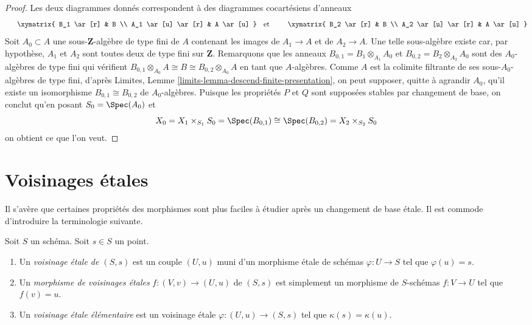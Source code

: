 \begin{proof}
Les deux diagrammes donnés correspondent à des diagrammes cocartésiens d'anneaux
$$
\vcenter{
\xymatrix{
B_1 \ar[r] & B \\
A_1 \ar[u] \ar[r] & A \ar[u]
}
}
\quad\text{et}\quad
\vcenter{
\xymatrix{
B_2 \ar[r] & B \\
A_2 \ar[u] \ar[r] & A \ar[u]
}
}
$$
Soit $A_0 \subset A$ une sous-$\mathbf{Z}$-algèbre de type fini de $A$
contenant les images de $A_1 \to A$ et de $A_2 \to A$. Une telle sous-algèbre
existe car, par hypothèse, $A_1$ et $A_2$ sont toutes deux de type fini sur
$\mathbf{Z}$. Remarquons que les anneaux $B_{0, 1} = B_1 \otimes_{A_1} A_0$
et $B_{0, 2} = B_2 \otimes_{A_2} A_0$ sont des $A_0$-algèbres de type fini
qui vérifient
$B_{0, 1} \otimes_{A_0} A \cong B \cong B_{0, 2} \otimes_{A_0} A$
en tant que $A$-algèbres. Comme $A$ est la colimite filtrante de ses
sous-$A_0$-algèbres de type fini, d'après
Limites, Lemme \ref{limits-lemma-descend-finite-presentation},
on peut supposer, quitte à agrandir $A_0$, qu'il existe un isomorphisme
$B_{0, 1} \cong B_{0, 2}$ de $A_0$-algèbres. Puisque les propriétés $P$ et $Q$
sont supposées stables par changement de base, on conclut qu'en posant
$S_0 = \Spec(A_0)$ et
$$
X_0 = X_1 \times_{S_1} S_0 =
\Spec(B_{0, 1}) \cong \Spec(B_{0, 2}) = X_2 \times_{S_2} S_0
$$
on obtient ce que l'on veut.
\end{proof}












\section{Voisinages \'etales}
\label{section-etale-neighbourhoods}

\noindent
Il s'avère que certaines propriétés des morphismes sont plus faciles à étudier
après un changement de base \'etale. Il est commode d'introduire la
terminologie suivante.

\begin{definition}
\label{definition-etale-neighbourhood}
Soit $S$ un schéma. Soit $s \in S$ un point.
\begin{enumerate}
\item Un {\it voisinage \'etale de $(S, s)$} est un
couple $(U, u)$ muni d'un morphisme \'etale
de schémas $\varphi : U \to S$ tel que $\varphi(u) = s$.
\item Un {\it morphisme de voisinages \'etales} $f : (V, v) \to (U, u)$
de $(S, s)$ est simplement un morphisme de $S$-schémas $f : V \to U$ tel
que $f(v) = u$.
\item Un {\it voisinage \'etale élémentaire} est un voisinage \'etale
$\varphi : (U, u) \to (S, s)$ tel que $\kappa(s) = \kappa(u)$.
\end{enumerate}
\end{definition}

